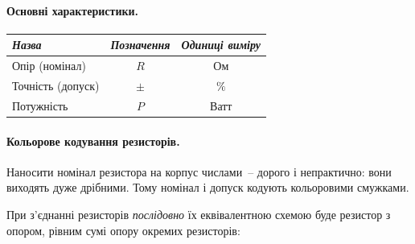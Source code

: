 \documentclass[12pt,a4paper]{report}  %
\begin{document}
\paragraph{Основні характеристики.}

\begin{center}
\begin{tabular}{|l|c|c|}
\hline
\textit{Назва} & \textit{Позначення} & \textit{Одиниці виміру} \\
\hline
Опір (номінал) & $R$ & Ом \\
\hline		
Точність (допуск) & $\pm$ & $ \% $ \\
\hline
Потужність & $P$ & Ватт \\
\hline
\end{tabular}
\end{center}

\begin{figure}[h!]
\label{ris:image}
\end{figure}



\paragraph{Кольорове кодування резисторів.}

Наносити номінал резистора на корпус числами~-- дорого і непрактично: вони виходять дуже дрібними. Тому номінал і допуск кодують кольоровими смужками.

При з'єднанні резисторів \textit{послідовно} їх еквівалентною схемою буде резистор з опором, рівним сумі опору окремих резисторів:
\end{document}
